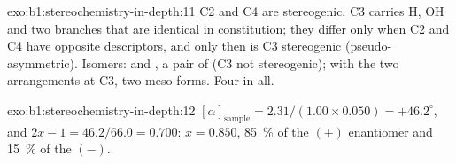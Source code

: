 \begin{solution}{exo:b1:stereochemistry-in-depth:11}
C2 and C4 are stereogenic. C3 carries H, OH and two branches that are
identical in constitution; they differ only when C2 and C4 have opposite
descriptors, and only then is C3 stereogenic (pseudo-asymmetric). Isomers:
 and , a pair of  (C3 not stereogenic);
 with the two arrangements at C3, two meso forms. Four in all.
\end{solution}

\begin{solution}{exo:b1:stereochemistry-in-depth:12}
$[\alpha]_{\text{sample}} = 2.31/(1.00 \times 0.050) = +46.2^\circ$, and
$2x - 1 = 46.2/66.0 = 0.700$: $x = 0.850$, \qty{85}{\percent} of the
$(+)$ enantiomer and \qty{15}{\percent} of the $(-)$.
\end{solution}

